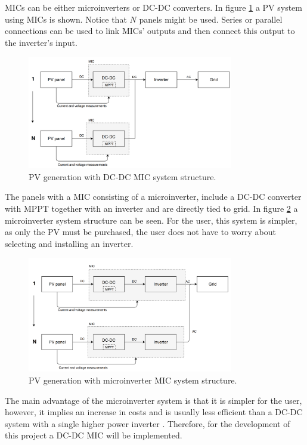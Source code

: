 MICs can be either microinverters or DC-DC converters. In figure \ref{MIC_dcdc} a PV system using MICs is shown. Notice that $N$ panels might be used. Series or parallel connections can be used to link MICs' outputs and then connect this output to the inverter's input.

\begin{figure}[H]
	\begin{center}
		\includegraphics[width=0.8\textwidth]{../Pictures/MIC_dcdc}
		\caption{PV generation with DC-DC MIC system structure.}
		\label{MIC_dcdc}
	\end{center}	
\end{figure}

The panels with a MIC consisting of a microinverter, include a DC-DC converter with MPPT together with an inverter and are directly tied to grid. In figure \ref{microinverter_system} a microinverter system structure can be seen. For the user, this system is simpler, as only the PV must be purchased, the user does not have to worry about selecting and installing an inverter. 

\begin{figure}[H]
	\begin{center}
	\includegraphics[width=0.8\textwidth]{../Pictures/MIC_microinverter}
		\caption{PV generation with microinverter MIC system structure.}
		\label{microinverter_system}
	\end{center}	
\end{figure}

The main advantage of the microinverter system is that it is simpler for the user, however, it implies an increase in costs and is usually less efficient than a DC-DC system with a single higher power inverter \cite{ArchitectureMIC}. Therefore, for the development of this project a DC-DC MIC will be implemented.